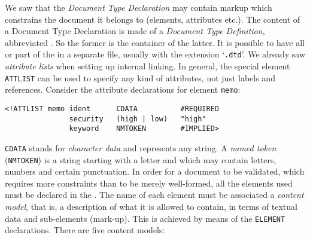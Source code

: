 We saw  that the \emph{Document Type
  Declaration} may contain markup which constrains the \XML document
it belongs to (elements, attributes etc.). The content of a Document
Type Declaration is made of a \emph{Document Type Definition},
abbreviated \DTD. So the former is the container of the latter. It is
possible to have all or part of the \DTD in a separate file, usually
with the extension `\texttt{.dtd}'. We already saw \emph{attribute
  lists}  when setting up internal
linking.  In general, the special element \texttt{ATTLIST} can be used
to specify any kind of attributes, not just labels and
references. Consider the attribute declarations for element
\texttt{memo}:
\begin{verbatim}
<!ATTLIST memo ident      CDATA          #REQUIRED
               security   (high | low)   "high"
               keyword    NMTOKEN        #IMPLIED>
\end{verbatim}
\texttt{CDATA} stands for \emph{character data} and represents any
string. A \emph{named token} (\texttt{NMTOKEN}) is a string starting
with a letter and which may contain letters, numbers and certain
punctuation. In order for a document to be validated, which requires
more constraints than to be merely well\hyp{}formed, all the elements
used must be declared in the \DTD. The name of each element must be
associated a \emph{content model}, that is, a description of what it
is allowed to contain, in terms of textual data and sub\hyp{}elements
(mark\hyp{}up). This is achieved by means of the \DTD \texttt{ELEMENT}
declarations. There are five content models:
